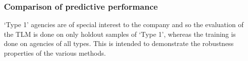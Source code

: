 \documentclass[ba]{imsart}
\begin{document}
\subsubsection{Comparison of predictive performance}
`Type 1' agencies are of special interest to the company and so the evaluation of the TLM is done on only holdout samples of `Type 1', whereas the training is done on agencies of all types. This is intended to demonstrate the robustness properties of the various methods. 
\end{document}
